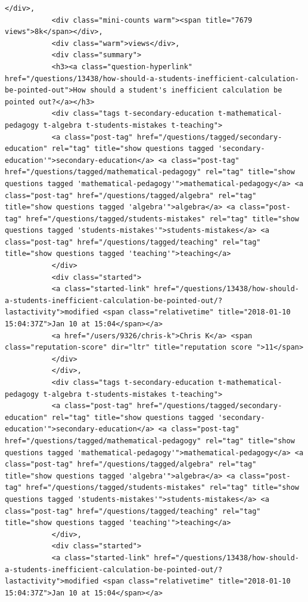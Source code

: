 \documentclass[11pt]{article}
\begin{document}
\begin{Verbatim}[commandchars=\\\{\}]
           </div>,
           <div class="mini-counts warm"><span title="7679 views">8k</span></div>,
           <div class="warm">views</div>,
           <div class="summary">
           <h3><a class="question-hyperlink" href="/questions/13438/how-should-a-students-inefficient-calculation-be-pointed-out">How should a student's inefficient calculation be pointed out?</a></h3>
           <div class="tags t-secondary-education t-mathematical-pedagogy t-algebra t-students-mistakes t-teaching">
           <a class="post-tag" href="/questions/tagged/secondary-education" rel="tag" title="show questions tagged 'secondary-education'">secondary-education</a> <a class="post-tag" href="/questions/tagged/mathematical-pedagogy" rel="tag" title="show questions tagged 'mathematical-pedagogy'">mathematical-pedagogy</a> <a class="post-tag" href="/questions/tagged/algebra" rel="tag" title="show questions tagged 'algebra'">algebra</a> <a class="post-tag" href="/questions/tagged/students-mistakes" rel="tag" title="show questions tagged 'students-mistakes'">students-mistakes</a> <a class="post-tag" href="/questions/tagged/teaching" rel="tag" title="show questions tagged 'teaching'">teaching</a>
           </div>
           <div class="started">
           <a class="started-link" href="/questions/13438/how-should-a-students-inefficient-calculation-be-pointed-out/?lastactivity">modified <span class="relativetime" title="2018-01-10 15:04:37Z">Jan 10 at 15:04</span></a>
           <a href="/users/9326/chris-k">Chris K</a> <span class="reputation-score" dir="ltr" title="reputation score ">11</span>
           </div>
           </div>,
           <div class="tags t-secondary-education t-mathematical-pedagogy t-algebra t-students-mistakes t-teaching">
           <a class="post-tag" href="/questions/tagged/secondary-education" rel="tag" title="show questions tagged 'secondary-education'">secondary-education</a> <a class="post-tag" href="/questions/tagged/mathematical-pedagogy" rel="tag" title="show questions tagged 'mathematical-pedagogy'">mathematical-pedagogy</a> <a class="post-tag" href="/questions/tagged/algebra" rel="tag" title="show questions tagged 'algebra'">algebra</a> <a class="post-tag" href="/questions/tagged/students-mistakes" rel="tag" title="show questions tagged 'students-mistakes'">students-mistakes</a> <a class="post-tag" href="/questions/tagged/teaching" rel="tag" title="show questions tagged 'teaching'">teaching</a>
           </div>,
           <div class="started">
           <a class="started-link" href="/questions/13438/how-should-a-students-inefficient-calculation-be-pointed-out/?lastactivity">modified <span class="relativetime" title="2018-01-10 15:04:37Z">Jan 10 at 15:04</span></a>

\end{Verbatim}
\end{document}
